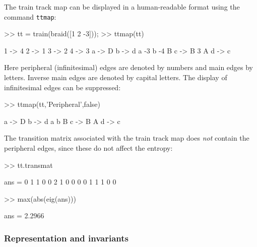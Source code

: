 \documentclass[12pt]{article}
\begin{document}
The train track map can be displayed in a human-readable format using the
command \lstinline{ttmap}: %
%
\begin{lstbraidlab}
>> tt = train(braid([1 2 -3]));
>> ttmap(tt)

 1 -> 4
 2 -> 1
 3 -> 2
 4 -> 3
 a -> D
 b -> d a -3 b -4 B
 c -> B 3 A
 d -> c
\end{lstbraidlab}
Here peripheral (infinitesimal) edges are denoted by numbers and main edges by
letters.  Inverse main edges are denoted by capital letters.  The display of
infinitesimal edges can be suppressed:
\begin{lstbraidlab}
>> ttmap(tt,'Peripheral',false)

 a -> D
 b -> d a b B
 c -> B A
 d -> c
\end{lstbraidlab}
The transition matrix associated with the train track map does \emph{not}
contain the peripheral edges, since these do not affect the entropy:
\begin{lstbraidlab}
>> tt.transmat

ans = 0     1     1     0
      0     2     1     0
      0     0     0     1
      1     1     0     0

>> max(abs(eig(ans)))

ans = 2.2966
\end{lstbraidlab}
%
%
%


\subsubsection{Representation and invariants}
\end{document}
